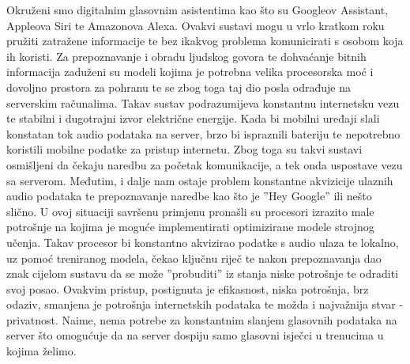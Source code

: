Okruženi smo digitalnim glasovnim asistentima kao što su Googleov Assistant,
Appleova Siri te Amazonova Alexa. Ovakvi sustavi mogu u vrlo kratkom
roku pružiti zatražene informacije te bez ikakvog problema komunicirati s osobom
koja ih koristi. Za prepoznavanje i obradu ljudskog govora te dohvaćanje bitnih
informacija zaduženi su modeli kojima je potrebna velika procesorska moć i dovoljno
prostora za pohranu te se zbog toga taj dio posla odrađuje na serverskim računalima.
Takav sustav podrazumijeva konstantnu internetsku vezu te stabilni i dugotrajni
izvor električne energije. Kada bi mobilni uređaji slali konstatan tok audio podataka
na server, brzo bi ispraznili bateriju te nepotrebno koristili mobilne podatke za
pristup internetu. Zbog toga su takvi sustavi osmišljeni da čekaju naredbu za
početak komunikacije, a tek onda uspostave vezu sa serverom. Međutim, i dalje
nam ostaje problem konstantne akvizicije ulaznih audio podataka te prepoznavanje
naredbe kao što je ”Hey Google” ili nešto slično. U ovoj situaciji savršenu primjenu
pronašli su procesori izrazito male potrošnje na kojima je moguće implementirati
optimizirane modele strojnog učenja. Takav procesor bi konstantno akvizirao podatke
s audio ulaza te lokalno, uz pomoć treniranog modela, čekao ključnu riječ te nakon
prepoznavanja dao znak cijelom sustavu da se može ”probuditi” iz stanja niske
potrošnje te odraditi svoj posao. Ovakvim pristup, postignuta je efikasnost, niska
potrošnja, brz odaziv, smanjena je potrošnja internetskih podataka te možda i
najvažnija stvar - privatnost. Naime, nema potrebe za konstantnim slanjem glasovnih
podataka na server što omogućuje da na server dospiju samo glasovni isječci u
trenucima u kojima želimo.
